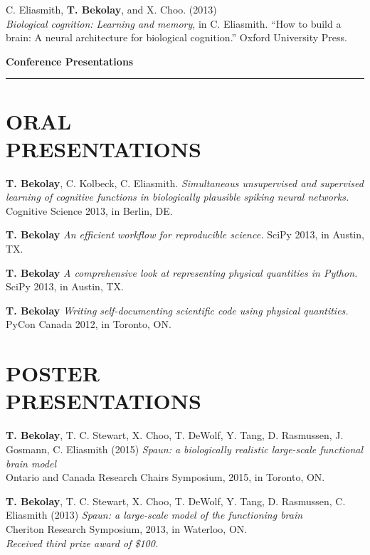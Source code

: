 \documentclass[line,margin]{res}
\begin{document}
\begin{resume}
C. Eliasmith, \textbf{T. Bekolay}, and X. Choo. (2013) \\
  {\sl Biological cognition: Learning and memory}, in C. Eliasmith.
  ``How to build a brain: A neural architecture for biological cognition.''
  Oxford University Press. \vspace{0.42em}

{\Large \bf Conference Presentations} \\ \vspace{-8pt} \hrule

\section{ORAL \\PRESENTATIONS}

\textbf{T. Bekolay}, C. Kolbeck, C. Eliasmith.
  {\sl Simultaneous unsupervised and supervised learning of cognitive
  functions in biologically plausible spiking neural networks.} \\
  Cognitive Science 2013, in Berlin, DE.

\textbf{T. Bekolay} {\sl An efficient workflow for reproducible science.}
  SciPy 2013, in Austin, TX.

\textbf{T. Bekolay}
  {\sl A comprehensive look at representing physical quantities in Python.}
  SciPy 2013, in Austin, TX.

\textbf{T. Bekolay}
  {\sl Writing self-documenting scientific code using physical quantities.}
  PyCon Canada 2012, in Toronto, ON.

\section{POSTER \\PRESENTATIONS}

\textbf{T. Bekolay}, T. C. Stewart, X. Choo, T. DeWolf, Y. Tang,
D. Rasmussen, J. Gosmann, C. Eliasmith (2015)
  {\sl Spaun: a biologically realistic large-scale functional brain model} \\
  Ontario and Canada Research Chairs Symposium, 2015, in Toronto, ON.

\textbf{T. Bekolay}, T. C. Stewart, X. Choo, T. DeWolf, Y. Tang,
D. Rasmussen, C. Eliasmith (2013)
  {\sl Spaun: a large-scale model of the functioning brain} \\
  Cheriton Research Symposium, 2013, in Waterloo, ON. \\
  {\sl Received third prize award of \$100.}


\end{resume}
\end{document}
